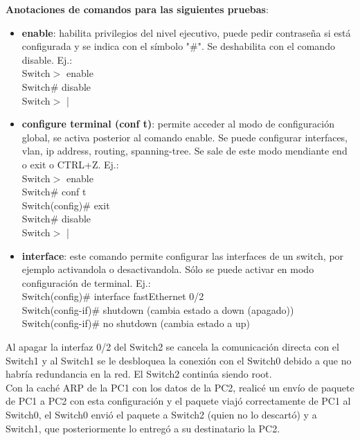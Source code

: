 \documentclass{article}
\begin{document}
    {\bfseries Anotaciones de comandos para las siguientes pruebas}:
    \begin{itemize}
        \item {\bfseries enable}: habilita privilegios del nivel ejecutivo, puede pedir contraseña si está configurada y se indica con el símbolo "\#". Se deshabilita con el comando disable. Ej.: \\
        Switch$>$ enable \\
        Switch\# disable \\
        Switch$>$ |
        \item {\bfseries configure terminal (conf t)}: permite acceder al modo de configuración global, se activa posterior al comando enable. Se puede configurar interfaces, vlan, ip address, routing, spanning-tree. Se sale de este modo mendiante end o exit o CTRL+Z. Ej.: \\
        Switch$>$ enable \\
        Switch\# conf t \\
        Switch(config)\# exit \\
        Switch\# disable \\
        Switch$>$ |
        \item {\bfseries interface}: este comando permite configurar las interfaces de un switch, por ejemplo activandola o desactivandola. Sólo se puede activar en modo configuración de terminal. Ej.: \\
        Switch(config)\# interface fastEthernet 0/2 \\
        Switch(config-if)\# shutdown (cambia estado a down (apagado)) \\
        Switch(config-if)\# no shutdown (cambia estado a up)
    \end{itemize}

    \pagebreak

    Al apagar la interfaz 0/2 del Switch2 se cancela la comunicación directa con el Switch1 y al Switch1 se le desbloquea la conexión con el Switch0 debido a que no habría redundancia en la red. El Switch2 continúa siendo root. \\
    Con la caché ARP de la PC1 con los datos de la PC2, realicé un envío de paquete de PC1 a PC2 con esta configuración y el paquete viajó correctamente de PC1 al Switch0, el Switch0 envió el paquete a Switch2 (quien no lo descartó) y a Switch1, que posteriormente lo entregó a su destinatario la PC2.
    
\end{document}
